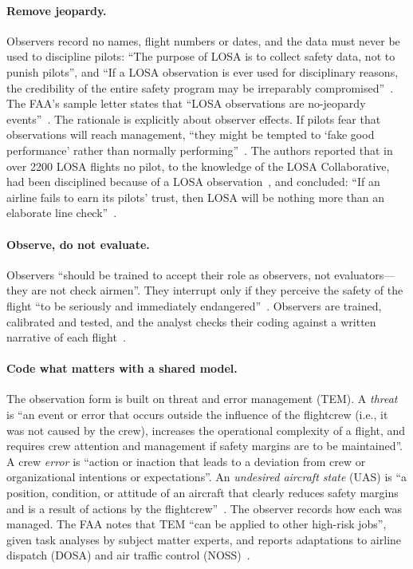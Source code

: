 \documentclass[11pt]{article}
\begin{document}
\paragraph{Remove jeopardy.} Observers record no names, flight numbers or dates, and the data must never be used to discipline pilots: ``The purpose of LOSA is to collect safety data, not to punish pilots'', and ``If a LOSA observation is ever used for disciplinary reasons, the credibility of the entire safety program may be irreparably compromised''~\cite[para.~10b(4)]{faa2006losa}. The FAA's sample letter states that ``LOSA observations are no-jeopardy events''~\cite[Appendix~4]{faa2006losa}. The rationale is explicitly about observer effects. If pilots fear that observations will reach management, ``they might be tempted to `fake good performance' rather than normally performing''~\cite[``Anonymous and confidential data collection'']{klinect2003}. The authors reported that in over \num{2200} LOSA flights no pilot, to the knowledge of the LOSA Collaborative, had been disciplined because of a LOSA observation~\cite[``Joint management/pilot association sponsorship'']{klinect2003}, and concluded: ``If an airline fails to earn its pilots' trust, then LOSA will be nothing more than an elaborate line check''~\cite[``Summary'']{klinect2003}.

\paragraph{Observe, do not evaluate.} Observers ``should be trained to accept their role as observers, not evaluators---they are not check airmen''. They interrupt only if they perceive the safety of the flight ``to be seriously and immediately endangered''~\cite[Appendix~2, 1a]{faa2006losa}. Observers are trained, calibrated and tested, and the analyst checks their coding against a written narrative of each flight~\cite[Appendix~2, 2a]{faa2006losa}.

\paragraph{Code what matters with a shared model.} The observation form is built on threat and error management (TEM). A \emph{threat} is ``an event or error that occurs outside the influence of the flightcrew (i.e., it was not caused by the crew), increases the operational complexity of a flight, and requires crew attention and management if safety margins are to be maintained''. A crew \emph{error} is ``action or inaction that leads to a deviation from crew or organizational intentions or expectations''. An \emph{undesired aircraft state} (UAS) is ``a position, condition, or attitude of an aircraft that clearly reduces safety margins and is a result of actions by the flightcrew''~\cite[Appendix~1, 2a--c]{faa2006losa}. The observer records how each was managed. The FAA notes that TEM ``can be applied to other high-risk jobs'', given task analyses by subject matter experts, and reports adaptations to airline dispatch (DOSA) and air traffic control (NOSS)~\cite[Appendix~1, note~1 and 3c]{faa2006losa}.
\end{document}
